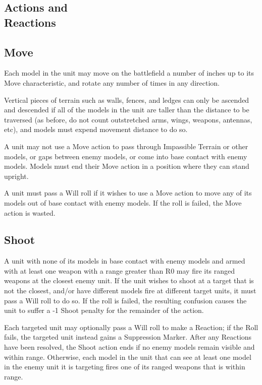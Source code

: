 \begin{multicols}{2}
\chapter*{Actions and\\ Reactions}

\section*{Move}
Each model in the unit may move on the battlefield a number of inches up to its Move characteristic, and rotate any number of times in any direction.

Vertical pieces of terrain such as walls, fences, and ledges can only be ascended and descended if all of the models in the unit are taller than the distance to be traversed (as before, do not count outstretched arms, wings, weapons, antennas, etc), and models must expend movement distance to do so.

A unit may not use a Move action to pass through Impassible Terrain or other models, or gaps between enemy models, or come into base contact with enemy models. Models must end their Move action in a position where they can stand upright. 

A unit must pass a Will roll if it wishes to use a Move action to move any of its models out of base contact with enemy models. If the roll is failed, the Move action is wasted.




\section*{Shoot}
A unit with none of its models in base contact with enemy models and armed with at least one weapon with a range greater than R0 may fire its ranged weapons at the closest enemy unit. If the unit wishes to shoot at a target that is not the closest, and/or have different models fire at different target units, it must pass a Will roll to do so. If the roll is failed, the resulting confusion causes the unit to suffer a -1 Shoot penalty for the remainder of the action.

Each targeted unit may optionally pass a Will roll to make a Reaction; if the Roll fails, the targeted unit instead gains a Suppression Marker. After any Reactions have been resolved, the Shoot action ends if no enemy models remain visible and within range. Otherwise, each model in the unit that can see at least one model in the enemy unit it is targeting fires one of its ranged weapons that is within range.


\end{multicols}
